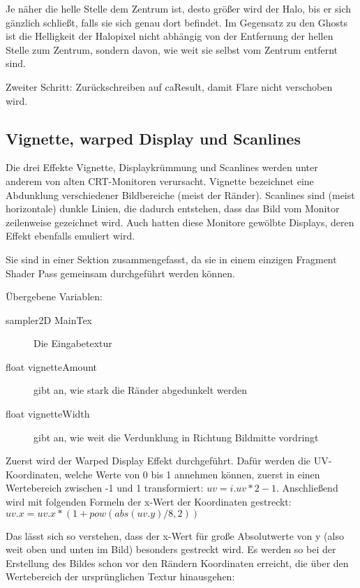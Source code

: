 Je näher die helle Stelle dem Zentrum ist, desto grö{\ss}er wird der Halo, bis er sich gänzlich schlie{\ss}t, falls sie sich genau dort befindet. Im Gegensatz zu den Ghosts ist die Helligkeit der Halopixel nicht abhängig von der Entfernung der hellen Stelle zum Zentrum, sondern davon, wie weit sie selbst vom Zentrum entfernt sind.

Zweiter Schritt: Zurückschreiben auf caResult, damit Flare nicht verschoben wird.



\subsection{Vignette, warped Display und Scanlines}

Die drei Effekte Vignette, Displaykrümmung und Scanlines werden unter anderem von alten CRT-Monitoren verursacht. Vignette bezeichnet eine Abdunklung verschiedener Bildbereiche (meist der Ränder). Scanlines sind (meist horizontale) dunkle Linien, die dadurch entstehen, dass das Bild vom Monitor zeilenweise gezeichnet wird. Auch hatten diese Monitore gewölbte Displays, deren Effekt ebenfalls emuliert wird.

Sie sind in einer Sektion zusammengefasst, da sie in einem einzigen Fragment Shader Pass gemeinsam durchgeführt werden können.

Übergebene Variablen:
\begin{description}
\item[sampler2D MainTex] Die Eingabetextur
\item[float vignetteAmount] gibt an, wie stark die Ränder abgedunkelt werden
\item[float vignetteWidth] gibt an, wie weit die Verdunklung in Richtung Bildmitte vordringt
\end{description}

Zuerst wird der Warped Display Effekt durchgeführt. Dafür werden die UV-Koordinaten, welche Werte von 0 bis 1 annehmen können, zuerst in einen Wertebereich zwischen -1 und 1 transformiert: $uv = i.uv * 2 - 1$.
Anschlie{\ss}end wird mit folgenden Formeln der x-Wert der Koordinaten gestreckt: $uv.x = uv.x * (1 + pow(abs(uv.y) / 8, 2))$

Das lässt sich so verstehen, dass der x-Wert für gro{\ss}e Absolutwerte von y (also weit oben und unten im Bild) besonders gestreckt wird. Es werden so bei der Erstellung des Bildes schon vor den Rändern Koordinaten erreicht, die über den Wertebereich der ursprünglichen Textur hinausgehen:

